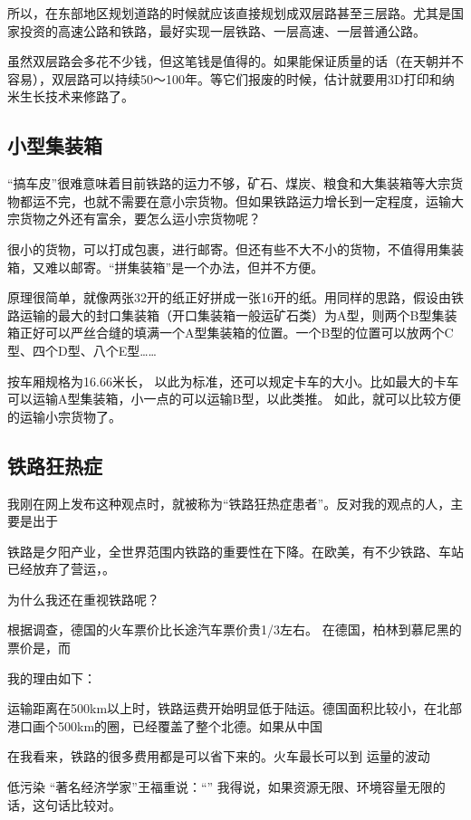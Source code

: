 所以，在东部地区规划道路的时候就应该直接规划成双层路甚至三层路。尤其是国家投资的高速公路和铁路，最好实现一层铁路、一层高速、一层普通公路。

虽然双层路会多花不少钱，但这笔钱是值得的。如果能保证质量的话（在天朝并不容易），双层路可以持续50～100年。等它们报废的时候，估计就要用3D打印和纳米生长技术来修路了。

\subsection{小型集装箱}
“搞车皮”很难意味着目前铁路的运力不够，矿石、煤炭、粮食和大集装箱等大宗货物都运不完，也就不需要在意小宗货物。但如果铁路运力增长到一定程度，运输大宗货物之外还有富余，要怎么运小宗货物呢？

很小的货物，可以打成包裹，进行邮寄。但还有些不大不小的货物，不值得用集装箱，又难以邮寄。“拼集装箱”是一个办法，但并不方便。

原理很简单，就像两张32开的纸正好拼成一张16开的纸。用同样的思路，假设由铁路运输的最大的封口集装箱（开口集装箱一般运矿石类）为A型，则两个B型集装箱正好可以严丝合缝的填满一个A型集装箱的位置。一个B型的位置可以放两个C型、四个D型、八个E型……

按车厢规格为16.66米长，
以此为标准，还可以规定卡车的大小。比如最大的卡车可以运输A型集装箱，小一点的可以运输B型，以此类推。
如此，就可以比较方便的运输小宗货物了。

\subsection{铁路狂热症}

我刚在网上发布这种观点时，就被称为“铁路狂热症患者”。反对我的观点的人，主要是出于

铁路是夕阳产业，全世界范围内铁路的重要性在下降。在欧美，有不少铁路、车站已经放弃了营运，。

为什么我还在重视铁路呢？

根据调查，德国的火车票价比长途汽车票价贵1/3左右。
在德国，柏林到慕尼黑的票价是，而

我的理由如下：
\begin{description}
\item 运输距离在500km以上时，铁路运费开始明显低于陆运。德国面积比较小，在北部港口画个500km的圈，已经覆盖了整个北德。如果从中国
\item[]
\end{description}
在我看来，铁路的很多费用都是可以省下来的。火车最长可以到
运量的波动

低污染
“著名经济学家”王福重说：“”
我得说，如果资源无限、环境容量无限的话，这句话比较对。

